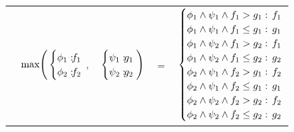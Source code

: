 \documentclass{article} %
\begin{document}
{\footnotesize
\begin{center}
\begin{tabular}{r c c c l}
&
\hspace{-7mm} $\mathrm{max} \Bigg(
  \begin{cases}
    \phi_1: \hspace{-2mm} & \hspace{-2mm} f_1 \\ 
    \phi_2: \hspace{-2mm} & \hspace{-2mm} f_2 \\ 
  \end{cases}$
$,$
&
\hspace{-4mm}
  $\begin{cases}
    \psi_1: \hspace{-2mm} & \hspace{-2mm} g_1 \\ 
    \psi_2: \hspace{-2mm} & \hspace{-2mm} g_2 \\ 
  \end{cases} \Bigg)$
&
\hspace{-4mm} 
$ = $
&
\hspace{-4mm}
  $\begin{cases}
  \phi_1 \wedge \psi_1 \wedge f_1 > g_1    : & \hspace{-2mm} f_1 \\ 
  \phi_1 \wedge \psi_1 \wedge f_1 \leq g_1 : & \hspace{-2mm} g_1 \\ 
  \phi_1 \wedge \psi_2 \wedge f_1 > g_2    : & \hspace{-2mm}f_1 \\ 
  \phi_1 \wedge \psi_2 \wedge f_1 \leq g_2 : & \hspace{-2mm} g_2 \\ 
  \phi_2 \wedge \psi_1 \wedge f_2 > g_1    : & \hspace{-2mm} f_2 \\ 
  \phi_2 \wedge \psi_1 \wedge f_2 \leq g_1 : & \hspace{-2mm} g_1 \\ 
  \phi_2 \wedge \psi_2 \wedge f_2 > g_2    : & \hspace{-2mm} f_2 \\ 
  \phi_2 \wedge \psi_2 \wedge f_2 \leq g_2 : & \hspace{-2mm} g_2 \\ 
  \end{cases}$
\end{tabular}
\end{center}
}
\end{document}
